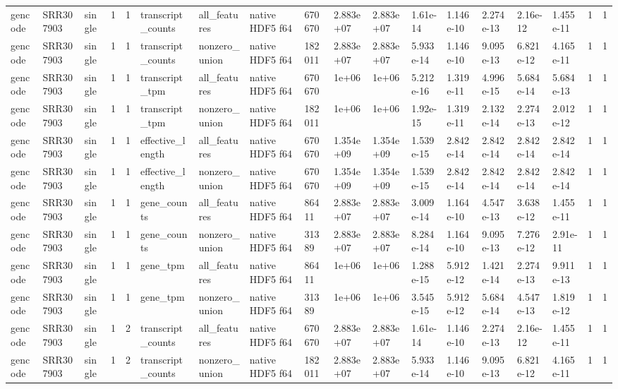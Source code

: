 \begin{tabular}{llllllllllllllllll}
gencode & SRR307903 & single & 1 & 1 & transcript\_counts & all\_features & native HDF5 f64 & 670670 & 2.883e+07 & 2.883e+07 & 1.61e-14 & 1.146e-10 & 2.274e-13 & 2.16e-12 & 1.455e-11 & 1 & 1 \\
gencode & SRR307903 & single & 1 & 1 & transcript\_counts & nonzero\_union & native HDF5 f64 & 182011 & 2.883e+07 & 2.883e+07 & 5.933e-14 & 1.146e-10 & 9.095e-13 & 6.821e-12 & 4.165e-11 & 1 & 1 \\
gencode & SRR307903 & single & 1 & 1 & transcript\_tpm & all\_features & native HDF5 f64 & 670670 & 1e+06 & 1e+06 & 5.212e-16 & 1.319e-11 & 4.996e-15 & 5.684e-14 & 5.684e-13 & 1 & 1 \\
gencode & SRR307903 & single & 1 & 1 & transcript\_tpm & nonzero\_union & native HDF5 f64 & 182011 & 1e+06 & 1e+06 & 1.92e-15 & 1.319e-11 & 2.132e-14 & 2.274e-13 & 2.012e-12 & 1 & 1 \\
gencode & SRR307903 & single & 1 & 1 & effective\_length & all\_features & native HDF5 f64 & 670670 & 1.354e+09 & 1.354e+09 & 1.539e-15 & 2.842e-14 & 2.842e-14 & 2.842e-14 & 2.842e-14 & 1 & 1 \\
gencode & SRR307903 & single & 1 & 1 & effective\_length & nonzero\_union & native HDF5 f64 & 670670 & 1.354e+09 & 1.354e+09 & 1.539e-15 & 2.842e-14 & 2.842e-14 & 2.842e-14 & 2.842e-14 & 1 & 1 \\
gencode & SRR307903 & single & 1 & 1 & gene\_counts & all\_features & native HDF5 f64 & 86411 & 2.883e+07 & 2.883e+07 & 3.009e-14 & 1.164e-10 & 4.547e-13 & 3.638e-12 & 1.455e-11 & 1 & 1 \\
gencode & SRR307903 & single & 1 & 1 & gene\_counts & nonzero\_union & native HDF5 f64 & 31389 & 2.883e+07 & 2.883e+07 & 8.284e-14 & 1.164e-10 & 9.095e-13 & 7.276e-12 & 2.91e-11 & 1 & 1 \\
gencode & SRR307903 & single & 1 & 1 & gene\_tpm & all\_features & native HDF5 f64 & 86411 & 1e+06 & 1e+06 & 1.288e-15 & 5.912e-12 & 1.421e-14 & 2.274e-13 & 9.911e-13 & 1 & 1 \\
gencode & SRR307903 & single & 1 & 1 & gene\_tpm & nonzero\_union & native HDF5 f64 & 31389 & 1e+06 & 1e+06 & 3.545e-15 & 5.912e-12 & 5.684e-14 & 4.547e-13 & 1.819e-12 & 1 & 1 \\
gencode & SRR307903 & single & 1 & 2 & transcript\_counts & all\_features & native HDF5 f64 & 670670 & 2.883e+07 & 2.883e+07 & 1.61e-14 & 1.146e-10 & 2.274e-13 & 2.16e-12 & 1.455e-11 & 1 & 1 \\
gencode & SRR307903 & single & 1 & 2 & transcript\_counts & nonzero\_union & native HDF5 f64 & 182011 & 2.883e+07 & 2.883e+07 & 5.933e-14 & 1.146e-10 & 9.095e-13 & 6.821e-12 & 4.165e-11 & 1 & 1 \\

\end{tabular}
